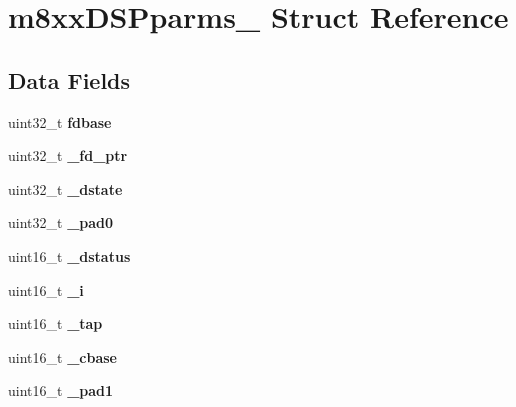 \hypertarget{structm8xxDSPparms__}{}\section{m8xx\+D\+S\+Pparms\+\_\+ Struct Reference}
\label{structm8xxDSPparms__}
\subsection*{Data Fields}
\begin{DoxyCompactItemize}
\item 
\mbox{\label{structm8xxDSPparms___a844a07983cb92f79cb7c6c419d06a9fb}} 
uint32\+\_\+t {\bfseries fdbase}
\item 
\mbox{\label{structm8xxDSPparms___a6c70b5eddc04b1aab60a1e56158cde98}} 
uint32\+\_\+t {\bfseries \+\_\+fd\+\_\+ptr}
\item 
\mbox{\label{structm8xxDSPparms___aed009df580bf73a2ffe2bd791c16d849}} 
uint32\+\_\+t {\bfseries \+\_\+dstate}
\item 
\mbox{\label{structm8xxDSPparms___ac461e01131aa62a111ce5e6f822945de}} 
uint32\+\_\+t {\bfseries \+\_\+pad0}
\item 
\mbox{\label{structm8xxDSPparms___acc1008f135a6bad63e3d0ef986f12337}} 
uint16\+\_\+t {\bfseries \+\_\+dstatus}
\item 
\mbox{\label{structm8xxDSPparms___a79d3351a947e7a31a8b25b3c258e0623}} 
uint16\+\_\+t {\bfseries \+\_\+i}
\item 
\mbox{\label{structm8xxDSPparms___afb9a5fff102c69f594988ecec03d6879}} 
uint16\+\_\+t {\bfseries \+\_\+tap}
\item 
\mbox{\label{structm8xxDSPparms___a2e9b17dc201d7dfb3a45c74872a49549}} 
uint16\+\_\+t {\bfseries \+\_\+cbase}
\item 
\mbox{\label{structm8xxDSPparms___a1f67aa29c56a59f6182277967fa4c87b}} 
uint16\+\_\+t {\bfseries \+\_\+pad1}
\item 

\end{DoxyCompactItemize}
